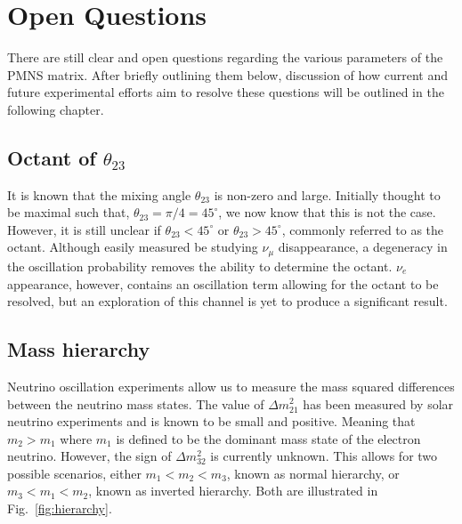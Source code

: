 \section{Open Questions} %
\label{sec:theory_questions} %

There are still clear and open questions regarding the various parameters of the PMNS matrix.
After briefly outlining them below, discussion of how current and future experimental efforts
aim to resolve these questions will be outlined in the following chapter.

\subsection[Octant of theta 23]{Octant of $\theta_{23}$} %
\label{sec:theory_questions_octant} %

It is known that the mixing angle $\theta_{23}$ is non-zero and large. Initially thought to be
maximal such that, $\theta_{23}=\pi/4=45^{\circ}$, we now know that this is not the case. However,
it is still unclear if $\theta_{23}<45^{\circ}$ or $\theta_{23}>45^{\circ}$, commonly referred to
as the octant. Although easily measured be studying $\nu_{\mu}$ disappearance, a degeneracy in the
oscillation probability removes the ability to determine the octant. $\nu_{e}$ appearance,
however, contains an oscillation term allowing for the octant to be resolved, but an exploration
of this channel is yet to produce a significant result.

\subsection{Mass hierarchy} %
\label{sec:theory_questions_hierarchy} %

Neutrino oscillation experiments allow us to measure the mass squared differences between the
neutrino mass states. The value of $\Delta m_{21}^2$ has been measured by solar neutrino
experiments and is known to be small and positive. Meaning that $m_{2}>m_{1}$ where $m_{1}$ is
defined to be the dominant mass state of the electron neutrino. However, the sign of $\Delta
    m_{32}^2$ is currently unknown. This allows for two possible scenarios, either $m_1<m_2<m_3$,
known as normal hierarchy, or $m_3<m_1<m_2$, known as inverted hierarchy. Both are illustrated
in Fig.~\ref{fig:hierarchy}.

